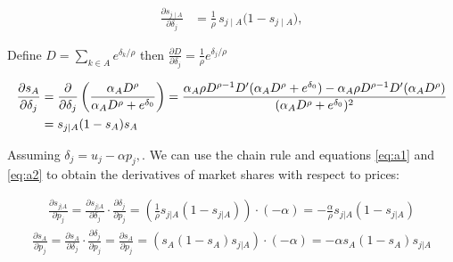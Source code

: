 \documentclass[12pt]{article}
\theoremstyle{plain}
\theoremstyle{plain}
\begin{document}
\begin{align}\label{eq:a1}
\frac{\partial s_{j\mid A}}{\partial \delta_j}
&=\frac{1}{\rho}\,s_{j\mid A}\big(1 - s_{j\mid A}\big), 
\end{align}

Define $D= \sum_{k\in A} e^{\delta_k/\rho}$ then $\frac{\partial D}{\partial \delta_j} =\frac{1}{\rho} e^{\delta_j/\rho} $

\begin{align}\label{eq:a2}
\frac{\partial s_A}{\partial \delta_j} &=
\frac{\partial}{\partial \delta_j}\left(\frac{\alpha_A D^\rho}{\alpha_A D^\rho + e^{\delta_0}}  \right) 
= \frac{\alpha_A \rho D^{\rho-1} D' (\alpha_A D^\rho + e^{\delta_0})-\alpha_A \rho D^{\rho-1} D' (\alpha_A D^\rho)}{(\alpha_A D^\rho + e^{\delta_0})^2} \notag \\ 
&= s_{j\mid A}  (1-s_A)s_A 
\end{align}


Assuming $\delta_j = u_j - \alpha p_j, $. We can use the chain rule and equations \ref{eq:a1} and \ref{eq:a2} to obtain the derivatives of market shares with respect to prices: 

\begin{align}\label{eq:a3}
     \frac{\partial s_{j|A}}{\partial p_j} = \frac{\partial s_{j|A}}{\partial \delta_j} \cdot \frac{\partial \delta_j}{\partial p_j} = \left(\frac{1}{\rho}s_{j|A}(1-s_{j|A})\right) \cdot (-\alpha) = -\frac{\alpha}{\rho}s_{j|A}(1-s_{j|A})
\end{align}
\begin{align}\label{eq:a4}
    \frac{\partial s_A}{\partial p_j} = \frac{\partial s_A}{\partial \delta_j} \cdot \frac{\partial \delta_j}{\partial p_j} = \frac{\partial s_A}{\partial p_j} = (s_A(1-s_A)s_{j|A}) \cdot (-\alpha) = -\alpha s_A(1-s_A)s_{j|A}    
\end{align}
\end{document}
